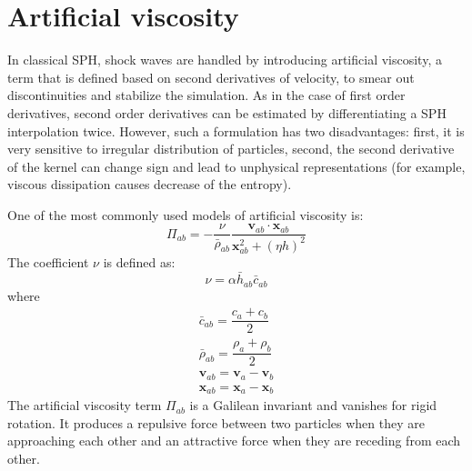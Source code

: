 \section{Artificial viscosity} \label{sec:artificial-viscosity}
In classical SPH, shock waves are handled by introducing artificial viscosity, a term that is defined based on second derivatives of velocity, to smear out discontinuities and stabilize the simulation. As in the case of first order derivatives, second order derivatives can be estimated by differentiating a SPH interpolation twice. However, such a formulation has two disadvantages: first, it is very sensitive to irregular distribution of particles, second, the second derivative of the kernel can change sign and lead to unphysical representations (for example, viscous dissipation causes decrease of the entropy). 

One of the most commonly used models of artificial viscosity \citep{monaghan1983shock} is:
\begin{equation}
\Pi_{ab}=- \frac{\nu}{\bar{\rho}_{ab}} \dfrac{ \textbf{v}_{ab} \cdot \textbf{x}_{ab}}{\textbf{x}_{ab}^2 + \left(\eta h\right)^2}
\label{eq:art-vis-original}
\end{equation}
The coefficient $\nu$ is defined as:
\begin{equation}
\nu = \alpha \bar{h}_{ab} \bar{c}_{ab}
\end{equation}
where 
\begin{align}
\bar{c}_{ab} = \dfrac{c_a + c_b}{2} \\
\bar{\rho}_{ab} = \dfrac{\rho_a + \rho_b}{2} \\
\textbf{v}_{ab}=\textbf{v}_a-\textbf{v}_b \\
\textbf{x}_{ab}=\textbf{x}_a-\textbf{x}_b
\end{align}
The artificial viscosity term $\Pi_{ab}$ is a Galilean invariant and vanishes for rigid rotation. It produces a repulsive force between two particles when they are approaching each other and an attractive force when they are receding from each other. 

